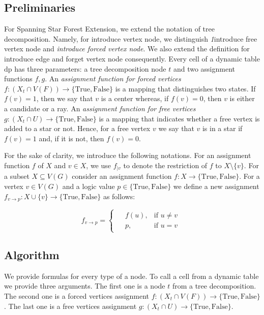 \documentclass[en]{pracamgr}
\newcommand{\ssfep}{{\sc Spanning Star Forest Extension}}
\newcommand{\true}{\textrm{True}}
\newcommand{\false}{\textrm{False}}
\begin{document}
\subsection{Preliminaries}

For \ssfep{}, we extend the notation of tree decomposition. Namely, for introduce vertex node, we distinguish \textit1{introduce free vertex node} and \textit{introduce forced vertex node}. We also extend the definition for introduce edge and forget vertex node consequently. Every cell of a dynamic table $\text{dp}$ has three parameters: a tree decomposition node $t$ and two assignment functions $f,g$. An \textit{assignment function for forced vertices} $f: (X_t \cap V(F)) \rightarrow \{\true, \false\}$ is a mapping that distinguishes two states. If $f(v)=1$, then we say that $v$ is a center whereas, if $f(v)=0$, then $v$ is either a candidate or a ray. An \textit{assignment function for free vertices} $g: (X_t \cap U) \rightarrow \{\true, \false\}$ is a mapping that indicates whether a free vertex is added to a star or not. Hence, for a free vertex $v$ we say that $v$ is in a star if $f(v)=1$ and, if it is not, then $f(v)=0$.

For the sake of clarity, we introduce the following notations. For an assignment function $f$ of $X$ and $v \in X$, we use $f_{|v}$ to denote the restriction of $f$ to $X \setminus \{v\}$. For a subset $X \subseteq V(G)$ consider an assignment function $f:X \rightarrow \{\true,\false\}$. For a vertex $v \in V(G)$ and a logic value $p \in \{\true, \false\}$ we define a new assignment $f_{v \rightarrow p}: X \cup \{v\} \rightarrow \{\true, \false\}$ as follows:

\begin{equation*}
	f_{v \rightarrow p} =
	\begin{cases}
	\begin{aligned}
		&f(u), & \text{if $u \neq v$} \\
		&p, &\text{if $u = v$}
	\end{aligned}
	\end{cases}
\end{equation*}

\subsection{Algorithm}

We provide formulas for every type of a node. To call a cell from a dynamic table we provide three arguments. The first one is a node $t$ from a tree decomposition. The second one is a forced vertices assignment $f:(X_t \cap V(F)) \rightarrow \{\true, \false\}$. The last one is  a free vertices assignment $g:(X_t \cap U) \rightarrow \{\true, \false\}$.
\end{document}
